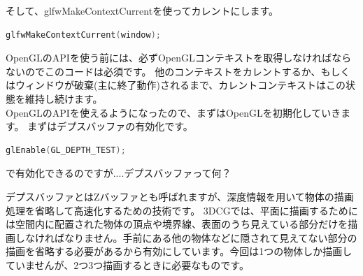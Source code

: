\documentclass[a4paper,titlepage,dvipdfmx]{jsarticle}
\begin{document}
そして、glfwMakeContextCurrentを使ってカレントにします。
\begin{lstlisting}[language=C++]
glfwMakeContextCurrent(window);
\end{lstlisting}
OpenGLのAPIを使う前には、必ずOpenGLコンテキストを取得しなければならないのでこのコードは必須です。
他のコンテキストをカレントするか、もしくはウィンドウが破棄(主に終了動作)されるまで、カレントコンテキストはこの状態を維持し続けます。\\
OpenGLのAPIを使えるようになったので、まずはOpenGLを初期化していきます。
まずはデプスバッファの有効化です。
\begin{lstlisting}[language=C++]
glEnable(GL_DEPTH_TEST);
\end{lstlisting}
で有効化できるのですが....デプスバッファって何？

デプスバッファとはZバッファとも呼ばれますが、深度情報を用いて物体の描画処理を省略して高速化するための技術です。
3DCGでは、平面に描画するためには空間内に配置された物体の頂点や境界線、表面のうち見えている部分だけを描画しなければなりません。手前にある他の物体などに隠されて見えてない部分の描画を省略する必要があるから有効にしています。今回は1つの物体しか描画していませんが、2つ3つ描画するときに必要なものです。
\end{document}
